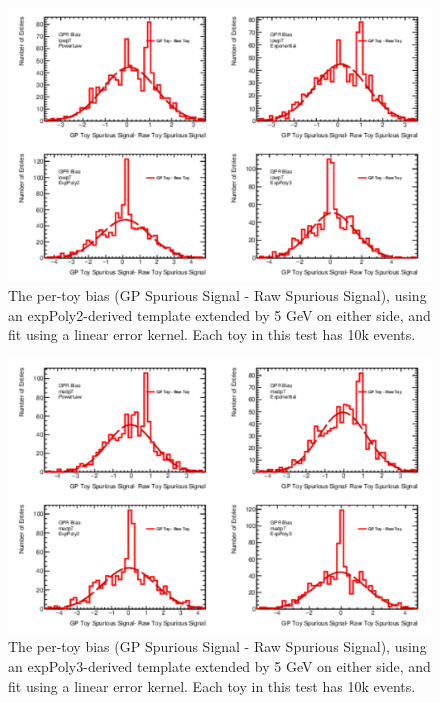\begin{figure} 
\begin{center}
  \includegraphics[width=\textwidth]{figures/background/gpr/validation/linear/ToyTest_FitSigBiases_lowpT_10k_noSig}   
\caption{The per-toy bias (GP Spurious Signal - Raw Spurious Signal), using an expPoly2-derived template extended by 5 GeV on either side, and fit using a linear error kernel. Each toy in this test has 10k events.}
\label{fig:bias_linearkernel_lowpt_10k_noSig}
\end{center}
\end{figure}

\begin{figure} 
\begin{center}
  \includegraphics[width=\textwidth]{figures/background/gpr/validation/linear/ToyTest_FitSigBiases_medpT_10k_noSig}   
\caption{The per-toy bias (GP Spurious Signal - Raw Spurious Signal), using an expPoly3-derived template extended by 5 GeV on either side, and fit using a linear error kernel. Each toy in this test has 10k events.}
\label{fig:bias_linearkernel_medpt_10k_noSig}
\end{center}
\end{figure}

